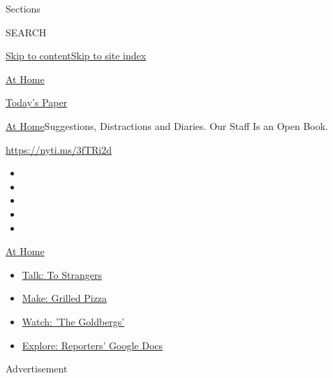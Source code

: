 Sections

SEARCH

\protect\hyperlink{site-content}{Skip to
content}\protect\hyperlink{site-index}{Skip to site index}

\href{https://www.nytimes.com/spotlight/at-home}{At Home}

\href{https://myaccount.nytimes.com/auth/login?response_type=cookie\&client_id=vi}{}

\href{https://www.nytimes.com/section/todayspaper}{Today's Paper}

\href{/spotlight/at-home}{At Home}\textbar{}Suggestions, Distractions
and Diaries. Our Staff Is an Open Book.

\url{https://nyti.ms/3fTRi2d}

\begin{itemize}
\item
\item
\item
\item
\item
\end{itemize}

\href{https://www.nytimes.com/spotlight/at-home?action=click\&pgtype=Article\&state=default\&region=TOP_BANNER\&context=at_home_menu}{At
Home}

\begin{itemize}
\tightlist
\item
  \href{https://www.nytimes.com/2020/08/03/well/family/the-benefits-of-talking-to-strangers.html?action=click\&pgtype=Article\&state=default\&region=TOP_BANNER\&context=at_home_menu}{Talk:
  To Strangers}
\item
  \href{https://www.nytimes.com/2020/08/01/at-home/coronavirus-make-pizza-on-a-grill.html?action=click\&pgtype=Article\&state=default\&region=TOP_BANNER\&context=at_home_menu}{Make:
  Grilled Pizza}
\item
  \href{https://www.nytimes.com/2020/07/31/arts/television/goldbergs-abc-stream.html?action=click\&pgtype=Article\&state=default\&region=TOP_BANNER\&context=at_home_menu}{Watch:
  'The Goldbergs'}
\item
  \href{https://www.nytimes.com/interactive/2020/at-home/even-more-reporters-editors-diaries-lists-recommendations.html?action=click\&pgtype=Article\&state=default\&region=TOP_BANNER\&context=at_home_menu}{Explore:
  Reporters' Google Docs}
\end{itemize}

Advertisement

